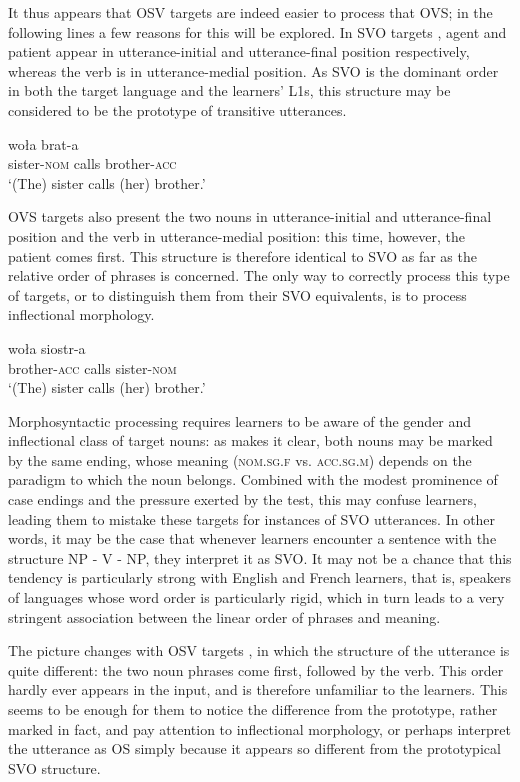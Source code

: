 It thus appears that OSV targets are indeed easier to process that OVS; in the following lines a few reasons for this will be explored. In SVO targets , agent and patient appear in utterance-initial and utterance-final position respectively, whereas the verb is in utterance-medial position. As SVO is the dominant order in both the target language and the learners' L1s, this structure may be considered to be the prototype of transitive utterances. 

\ea%
    \label{ex:05:1}
       {woła}   {brat-a}\\
            sister-\textsc{nom}   calls  brother-\textsc{acc}\\
    \glt    `(The) sister calls (her) brother.'
    \z

OVS targets also present the two nouns in utterance-initial and utterance-final position and the verb in utterance-medial position: this time, however, the patient comes first. This structure is therefore identical to SVO as far as the relative order of phrases is concerned. The only way to correctly process this type of targets, or to distinguish them from their SVO equivalents, is to process inflectional morphology.  

\ea%
    \label{ex:05:2}
         {woła}  {siostr-a}\\
            brother-\textsc{acc}  calls  sister-\textsc{nom}\\
    \glt    `(The) sister calls (her) brother.'
    \z

Morphosyntactic processing requires learners to be aware of the gender and inflectional class of target nouns: as  makes it clear, both nouns may be marked by the same ending, whose meaning (\textsc{nom.sg.f} vs. \textsc{acc.sg.m}) depends on the paradigm to which the noun belongs. Combined with the modest prominence of case endings and the pressure exerted by the test, this may confuse learners, leading them to mistake these targets for instances of SVO utterances. In other words, it may be the case that whenever learners encounter a sentence with the structure NP - V - NP, they interpret it as SVO. It may not be a chance that this tendency is particularly strong with English and French learners, that is, speakers of languages whose word order is particularly rigid, which in turn leads to a very stringent association between the linear order of phrases and meaning.

The picture changes with OSV targets , in which the structure of the utterance is quite different: the two noun phrases come first, followed by the verb. This order hardly ever appears in the input, and is therefore unfamiliar to the learners. This seems to be enough for them to notice the difference from the prototype, rather marked in fact, and pay attention to inflectional morphology, or perhaps interpret the utterance as OS simply because it appears so different from the prototypical SVO structure. 

